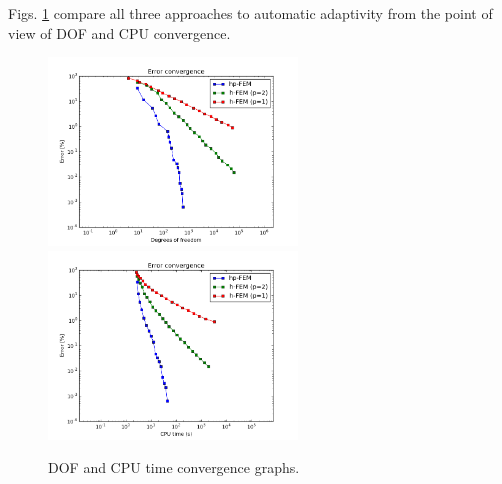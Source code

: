Figs. \ref{fig:nist-6-conv} compare all
three approaches to automatic adaptivity from the point
of view of DOF and CPU convergence.

\begin{figure}[!ht]
\centering
\includegraphics[height=5cm]{nist/nist-6/conv_dof_aniso.png}\ \
\includegraphics[height=5cm]{nist/nist-6/conv_cpu_aniso.png}
\caption{DOF and CPU time convergence graphs.}
\label{fig:nist-6-conv}
\end{figure}

